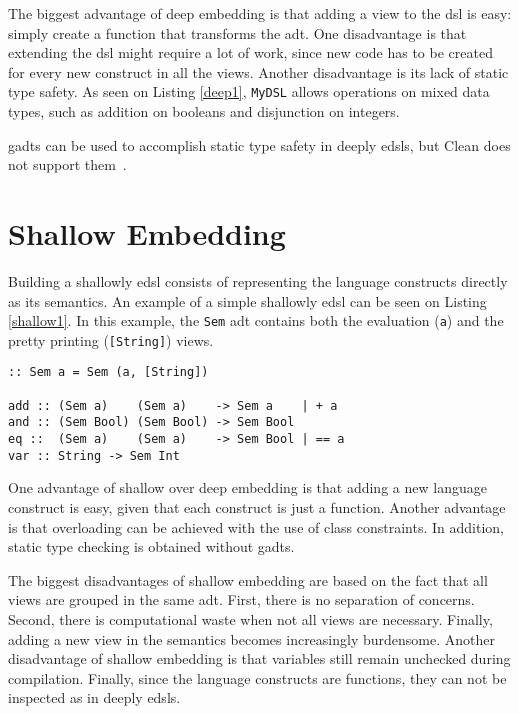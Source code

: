 The biggest advantage of deep embedding is that adding a view to the \ac{dsl} is easy: simply create a function that transforms the \ac{adt}. One disadvantage is that extending the \ac{dsl} might require a lot of work, since new code has to be created for every new construct in all the views. Another disadvantage is its lack of static type safety. As seen on Listing \ref{deep1}, \texttt{MyDSL} allows operations on mixed data types, such as addition on booleans and disjunction on integers. 

\acp{gadt} can be used to accomplish static type safety in deeply \acp{edsl}, but Clean does not support them~\cite{gadts}. 

\section{Shallow Embedding}
Building a shallowly \ac{edsl} consists of representing the language constructs directly as its semantics. An example of a simple shallowly \ac{edsl} can be seen on Listing \ref{shallow1}. In this example, the \texttt{Sem} \ac{adt} contains both the evaluation (\texttt{a}) and the pretty printing (\texttt{[String]}) views.

\begin{lstlisting}[caption=A simple shallowly \ac{edsl},captionpos=b,label=shallow1]
:: Sem a = Sem (a, [String])

add :: (Sem a)    (Sem a)    -> Sem a    | + a
and :: (Sem Bool) (Sem Bool) -> Sem Bool
eq ::  (Sem a)    (Sem a)    -> Sem Bool | == a
var :: String -> Sem Int
\end{lstlisting}

One advantage of shallow over deep embedding is that adding a new language construct is easy, given that each construct is just a function. Another advantage is that overloading can be achieved with the use of class constraints. In addition, static type checking is obtained without \acp{gadt}. 

The biggest disadvantages of shallow embedding are based on the fact that all views are grouped in the same \ac{adt}. First, there is no separation of concerns. Second, there is computational waste when not all views are necessary. Finally, adding a new view in the semantics becomes increasingly burdensome. Another disadvantage of shallow embedding is that variables still remain unchecked during compilation. Finally, since the language constructs are functions, they can not be inspected as in deeply \acp{edsl}.

